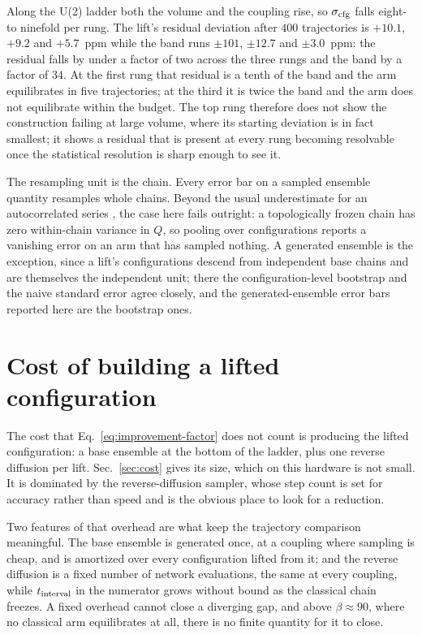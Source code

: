 \documentclass[prd, twocolumn, superscriptaddress, nofootinbib,floatfix]{revtex4-2}
\DeclareRobustCommand{\Eq}[1]{Eq.~\eqref{eq:#1}}
\DeclareRobustCommand{\sect}[1]{Sec.~\ref{sec:#1}}
\begin{document}
Along the U(2) ladder both the volume and the coupling rise, so $\sigma_{\rm
cfg}$ falls eight- to ninefold per rung. The lift's residual deviation after $400$
trajectories is $+10.1$, $+9.2$ and $+5.7$~ppm while the
band runs $\pm101$, $\pm12.7$ and $\pm3.0$~ppm: the residual falls by under a
factor of two across the three rungs and the band by a factor of $34$. At the
first rung that residual is a tenth of the band and the arm equilibrates in five
trajectories; at the third it is twice the band and the arm does not equilibrate
within the budget. The top rung therefore does not show the construction failing at large
volume, where its starting deviation is in fact smallest; it shows a residual
that is present at every rung becoming resolvable once the statistical
resolution is sharp enough to see it.

The resampling unit is the chain. Every error bar on a sampled ensemble quantity
resamples whole chains. Beyond the usual underestimate for an autocorrelated
series \cite{wolff2004}, the case here fails outright: a topologically frozen
chain has zero within-chain variance in $Q$, so pooling over configurations
reports a vanishing error on an arm that has sampled nothing. A generated
ensemble is the exception, since a lift's configurations descend from
independent base chains and are themselves the independent unit; there the
configuration-level bootstrap and the naive standard error agree closely, and
the generated-ensemble error bars reported here are the bootstrap ones.

\section{Cost of building a lifted configuration}
\label{app:overhead}

The cost that \Eq{improvement-factor} does not count is producing the
lifted configuration: a base ensemble at the bottom of the ladder, plus
one reverse diffusion per lift. \sect{cost} gives its size, which on this
hardware is not small. It is dominated by the reverse-diffusion sampler, whose
step count is set for accuracy rather than speed and is the obvious place to
look for a reduction.

Two features of that overhead are what keep the trajectory comparison
meaningful. The base ensemble is generated once, at a coupling where sampling is
cheap, and is amortized over every configuration lifted from it; and the reverse
diffusion is a fixed number of network evaluations, the same at every coupling,
while $t_{\rm interval}$ in the numerator grows without bound as the classical
chain freezes. A fixed overhead cannot close a diverging gap, and above
$\beta\approx90$, where no classical arm equilibrates at all, there is no finite
quantity for it to close.
\end{document}
